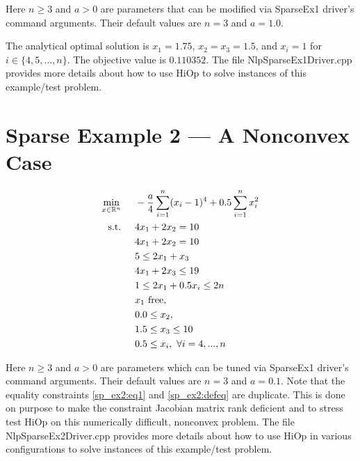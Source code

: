 \documentclass[11pt,letterpaper]{article}
\begin{document}
Here $n\geq3$ and $a>0$ are parameters that can be modified via SparseEx1 driver's command arguments. Their default values are $n=3$ and $a=1.0$.

The analytical optimal solution is  $x_1=1.75$, $x_2=x_3=1.5$, and $x_i=1$ for $i\in \{4,5,\ldots,n\}$. The objective value is $0.110352$. The file NlpSparseEx1Driver.cpp provides more details about how to use HiOp to solve instances of this example/test problem.

\section{Sparse Example 2 --- A Nonconvex Case}
\begin{align}
    &&&&\min_{x\in\mathbb{R}^n} & \hspace{0.5cm} -\frac{a}{4}\sum_{i=1}^{n} (x_i-1)^4 + 0.5\sum_{i=1}^{n} x_i^2&&&& \label{sp_ex2:obj}\\
    &&&&\textnormal{s.t.} &\hspace{0.5cm}  4x_1+2x_2 = 10 &&&& \label{sp_ex2:eq1}\\
    &&&&& \hspace{0.5cm}  4x_1+2x_2 = 10 &&&& \label{sp_ex2:defeq}\\
    &&&&& \hspace{0.5cm}  5 \leq  2x_1 + x_3                 &&&& \label{sp_ex2:ineq1}\\
    &&&&& \hspace{0.5cm}          4x_1      + 2x_3   \leq 19 &&&& \label{sp_ex2:defineq}\\
    &&&&& \hspace{0.5cm}  1 \leq  2x_1      + 0.5x_i \leq 2n &&&& \label{sp_ex2:ineq2}\\
    &&&&& \hspace{0.5cm}  x_1~\textnormal{free}, &&&& \label{sp_ex2:varb1}\\
    &&&&& \hspace{0.5cm}  0.0 \leq x_2, &&&& \label{sp_ex2:varb2}\\
    &&&&& \hspace{0.5cm}  1.5 \leq x_3 \leq 10  &&&& \label{sp_ex2:varb3}\\
    &&&&& \hspace{0.5cm}  0.5 \leq x_i, \ \forall i=4,...,n    &&& \label{sp_ex2:varb4}
\end{align}

Here $n\geq3$ and $a>0$ are parameters which can be tuned via SparseEx1 driver's command arguments. Their default values are  $n=3$ and $a=0.1$. Note that the equality constraints \eqref{sp_ex2:eq1} and \eqref{sp_ex2:defeq} are duplicate. This is done on purpose to make the constraint Jacobian matrix rank deficient and to stress test HiOp on this numerically difficult, nonconvex problem. The file NlpSparseEx2Driver.cpp provides more details about how to use HiOp in various configurations to solve instances of this example/test problem.
\end{document}
